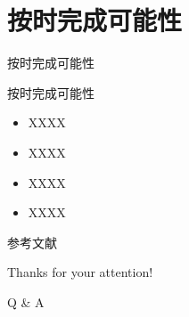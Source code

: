 \documentclass{beamer}
\begin{document}
\section{按时完成可能性}

\begin{frame}{按时完成可能性}
  \begin{block}{按时完成可能性}
    \begin{itemize}
      \setlength{\itemsep}{6pt}
      \item XXXX\cite{xin1994}
      \item XXXX\cite{zhai2015}
      \item XXXX\cite{jones2004}
      \item XXXX\cite{mcmahan2005}
    \end{itemize}
  \end{block}
\end{frame}

\begin{frame}[allowframebreaks]{参考文献}
  
  
\end{frame}

\begin{frame}
	\begin{center}
    {\Huge\calligra Thanks for your attention!}
    \vspace{1cm}

    {\Huge Q \& A}
  \end{center}
\end{frame}

\end{document}
